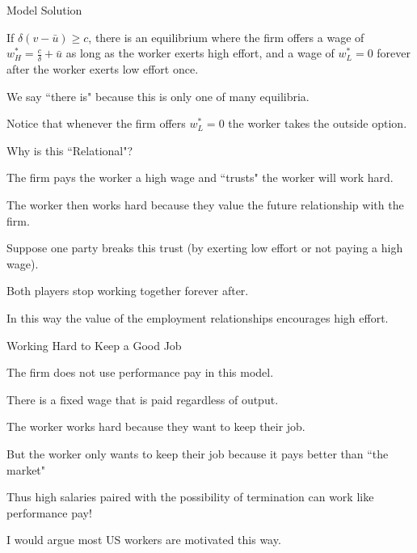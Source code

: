 \documentclass[aspectratio=169,usenames,dvipsnames]{beamer}
\newenvironment{wideitemize}{\itemize\addtolength{\itemsep}{10pt}}{\enditemize}
\begin{document}
\begin{frame}{Model Solution}

\begin{theorem}
    If $\delta(v-\bar u) \geq c$, there is an equilibrium where the firm offers a wage of $w_H^*=\frac{c}{\delta}+\bar u$ as long as the worker exerts high effort, and a wage of $w_L^*=0$ forever after the worker exerts low effort once.
\end{theorem}
    \begin{wideitemize}
        \item We say ``there is" because this is only one of many equilibria.
        \item Notice that whenever the firm offers $w_L^*=0$ the worker takes the outside option.
    \end{wideitemize}
\end{frame}

\begin{frame}{Why is this ``Relational"?}

\begin{wideitemize}
    \item The firm pays the worker a high wage and ``trusts" the worker will work hard.
    \item The worker then works hard because they value the future relationship with the firm.
    \item Suppose one party breaks this trust (by exerting low effort or not paying a high wage).
    \item Both players stop working together forever after.
    \item In this way the value of the employment relationships encourages high effort.
\end{wideitemize}
    
\end{frame}

\begin{frame}{Working Hard to Keep a Good Job}

\begin{wideitemize}
    \item The firm does not use performance pay in this model.
    \item There is a fixed wage that is paid regardless of output.
    \item The worker works hard because they want to keep their job.
    \item But the worker only wants to keep their job because it pays better than ``the market"
    \item Thus high salaries paired with the possibility of termination can work like performance pay!
    \item I would argue most US workers are motivated this way.
\end{wideitemize}
    
\end{frame}
\end{document}

